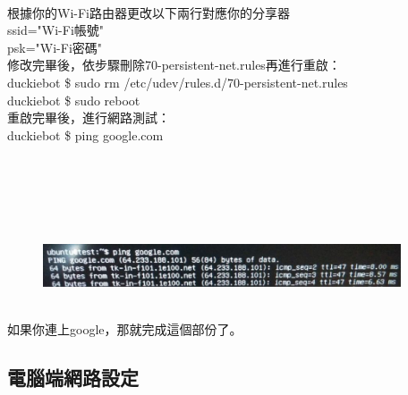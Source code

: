 \documentclass{article}
\begin{document}
\\根據你的Wi-Fi路由器更改以下兩行對應你的分享器
\\ssid="Wi-Fi帳號"
\\psk="Wi-Fi密碼"
\\修改完畢後，依步驟刪除70-persistent-net.rules再進行重啟：
\\duckiebot \$ sudo rm /etc/udev/rules.d/70-persistent-net.rules
\\duckiebot \$ sudo reboot
\\重啟完畢後，進行網路測試：
\\duckiebot \$ ping google.com
\\\\\\\\\\\\
\begin{figure}[htp]
    \begin{center}
        \includegraphics[width=300pt]{pic/圖片12.jpg}
    \end{center}
\end{figure}
\\如果你連上google，那就完成這個部份了。

\subsection{電腦端網路設定}
\end{document}
